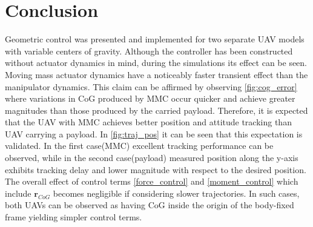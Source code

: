 \section{Conclusion}
Geometric control was presented and implemented for two separate UAV models with variable centers of gravity. Although the controller has been constructed without actuator dynamics in mind, during the simulations its effect can be seen. \\
Moving mass actuator dynamics have a noticeably faster transient effect than the manipulator dynamics. This claim can be affirmed by observing \ref{fig:cog_error} where variations in CoG produced by MMC occur quicker and achieve greater magnitudes than those produced by the carried payload. Therefore, it is expected that the UAV with MMC achieves better position and attitude tracking than UAV carrying a payload. In \ref{fig:traj_pos} it can be seen that this expectation is validated. In the first case(MMC) excellent tracking performance can be observed, while in the second case(payload) measured position along the y-axis exhibits tracking delay and lower magnitude with respect to the desired position. \\
The overall effect of control terms \ref{force_control} and \ref{moment_control} which include $\textbf{r}_{CoG}$ becomes negligible if considering slower trajectories. In such cases, both UAVs can be observed as having CoG inside the origin of the body-fixed frame yielding simpler control terms.
